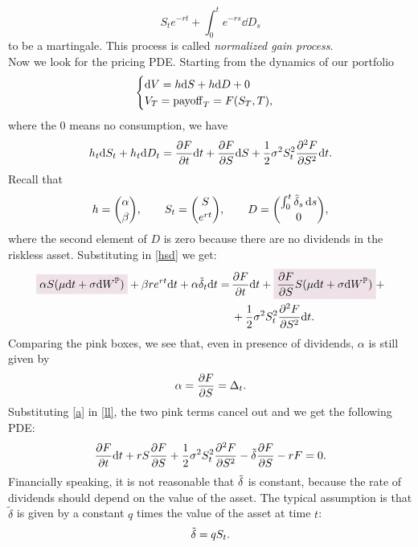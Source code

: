 \begin{equation}
    S_te^{-rt} + \int_0^t e^{-rs}\dd D_s
\end{equation}
to be a martingale. This process is called \emph{normalized gain process}. \\
Now we look for the pricing PDE. Starting from the dynamics of our portfolio
\begin{equation}
    \begin{cases}
    \dd V = h \dd S + h \dd D + 0 \\
    V_T = \operatorname{payoff}_T = F(S_T,T),
    \end{cases}
\end{equation}
where the 0 means no consumption, we have
\begin{equation}\label{hsd}
    h_t \dd S_t + h_t \dd D_t = \pdv{F}{t}\dd t + \pdv{F}{S}\dd S + \dfrac{1}{2}\sigma^2S_t^2\pdv[2]{F}{S}\dd t.
\end{equation}
Recall that
\begin{equation}
    h = \binom{\alpha}{\beta}, \qquad S_t = \binom{S}{e^{rt}}, \qquad D = \binom{\int^t_0\Tilde{\delta}_s\,\dd s}{0},
\end{equation}
where the second element of $D$ is zero because there are no dividends in the riskless asset. Substituting in \eqref{hsd} we get:
\begin{align}\label{ll}
    \notag\hlc{mypink}{\alpha S(\mu\dd t + \sigma\dd W^{\Pmeas})}+\beta re^{rt}\dd t + \alpha\Tilde{\delta}_t\dd t =\, &\pdv{F}{t}\dd t + \hlc{mypink}{\pdv{F}{S}S(\mu\dd t + \sigma\dd W^{\Pmeas})} + \\
    &+ \dfrac{1}{2}\sigma^2S_t^2\pdv[2]{F}{S}\dd t.
\end{align}
Comparing the pink boxes, we see that, even in presence of dividends, $\alpha$ is still given by
\begin{equation}\label{a}
    \alpha = \pdv{F}{S} = \Delta_t.
\end{equation}
Substituting \eqref{a} in \eqref{ll}, the two pink terms cancel out and we get the following PDE:
\begin{equation}
    \pdv{F}{t}\dd t + rS\pdv{F}{S} + \dfrac{1}{2}\sigma^2S_t^2\pdv[2]{F}{S} - \Tilde{\delta}\pdv{F}{S} - rF = 0.
\end{equation}
Financially speaking, it is not reasonable that $\Tilde{\delta}$ is constant, because the rate of dividends should depend on the value of the asset. The typical assumption is that $\tilde{\delta}$ is given by a constant $q$ times the value of the asset at time $t$:
\begin{equation}
    \Tilde{\delta} = qS_t.
\end{equation}
